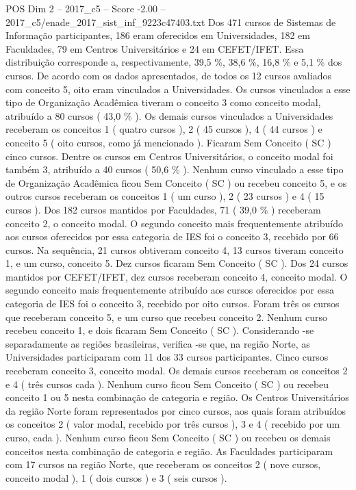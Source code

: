 \begin{textsample}{POS Dim 2 – 2017\_c5 – Score -2.00 – 2017\_c5/enade\_2017\_sist\_inf\_9223c47403.txt}
Dos 471 cursos de Sistemas de Informação participantes, 186 eram oferecidos em Universidades, 182 em Faculdades, 79 em Centros Universitários e 24 em CEFET/IFET.
Essa distribuição corresponde a, respectivamente, 39,5 \%, 38,6 \%, 16,8 \% e 5,1 \% dos cursos.
De acordo com os dados apresentados, de todos os 12 cursos avaliados com conceito 5, oito eram vinculados a Universidades.
Os cursos vinculados a esse tipo de Organização Acadêmica tiveram o conceito 3 como conceito modal, atribuído a 80 cursos ( 43,0 \% ).
Os demais cursos vinculados a Universidades receberam os conceitos 1 ( quatro cursos ), 2 ( 45 cursos ), 4 ( 44 cursos ) e conceito 5 ( oito cursos, como já mencionado ).
Ficaram Sem Conceito ( SC ) cinco cursos.
Dentre os cursos em Centros Universitários, o conceito modal foi também 3, atribuído a 40 cursos ( 50,6 \% ).
Nenhum curso vinculado a esse tipo de Organização Acadêmica ficou Sem Conceito ( SC ) ou recebeu conceito 5, e os outros cursos receberam os conceitos 1 ( um curso ), 2 ( 23 cursos ) e 4 ( 15 cursos ).
Dos 182 cursos mantidos por Faculdades, 71 ( 39,0 \% ) receberam conceito 2, o conceito modal.
O segundo conceito mais frequentemente atribuído aos cursos oferecidos por essa categoria de IES foi o conceito 3, recebido por 66 cursos.
Na sequência, 21 cursos obtiveram conceito 4, 13 cursos tiveram conceito 1, e um curso, conceito 5.
Dez cursos ficaram Sem Conceito ( SC ).
Dos 24 cursos mantidos por CEFET/IFET, dez cursos receberam conceito 4, conceito modal.
O segundo conceito mais frequentemente atribuído aos cursos oferecidos por essa categoria de IES foi o conceito 3, recebido por oito cursos.
Foram três os cursos que receberam conceito 5, e um curso que recebeu conceito 2.
Nenhum curso recebeu conceito 1, e dois ficaram Sem Conceito ( SC ).
Considerando -se separadamente as regiões brasileiras, verifica -se que, na região Norte, as Universidades participaram com 11 dos 33 cursos participantes.
Cinco cursos receberam conceito 3, conceito modal.
Os demais cursos receberam os conceitos 2 e 4 ( três cursos cada ).
Nenhum curso ficou Sem Conceito ( SC ) ou recebeu conceito 1 ou 5 nesta combinação de categoria e região.
Os Centros Universitários da região Norte foram representados por cinco cursos, aos quais foram atribuídos os conceitos 2 ( valor modal, recebido por três cursos ), 3 e 4 ( recebido por um curso, cada ).
Nenhum curso ficou Sem Conceito ( SC ) ou recebeu os demais conceitos nesta combinação de categoria e região.
As Faculdades participaram com 17 cursos na região Norte, que receberam os conceitos 2 ( nove cursos, conceito modal ), 1 ( dois cursos ) e 3 ( seis cursos ).

\end{textsample}

